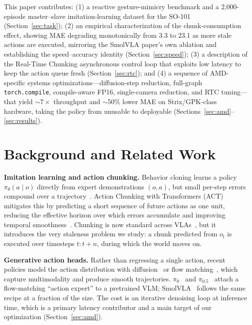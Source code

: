 \documentclass[blind]{gtac}
\begin{document}
This paper contributes: (1) a reactive gesture-mimicry benchmark and a
2{,}000-episode master--slave imitation-learning dataset for the SO-101
(Section~\ref{sec:task}); (2) an empirical characterization of the
chunk-consumption effect, showing MAE degrading monotonically from 3.3 to 23.1
as more stale actions are executed, mirroring the SmolVLA
paper's own ablation and establishing the speed--accuracy identity
(Section~\ref{sec:speed}); (3) a description of the Real-Time Chunking
asynchronous control loop that exploits low latency to keep the action queue
fresh (Section~\ref{sec:rtc}); and (4) a sequence of AMD-specific systems
optimizations---diffusion-step reduction, full-graph \texttt{torch.compile},
compile-aware FP16, single-camera reduction, and RTC tuning---that yield $\sim
7\times$ throughput and $\sim$50\% lower MAE on Strix/GPK-class hardware, taking
the policy from unusable to deployable (Sections~\ref{sec:amd}--\ref{sec:results}).

\section{Background and Related Work}
\label{sec:background}

\textbf{Imitation learning and action chunking.}
Behavior cloning learns a policy $\pi_\theta(a\mid o)$ directly from
expert demonstrations $(o,a)$, but small per-step errors compound over a
trajectory~\cite{act}. Action Chunking with Transformers (ACT) mitigates this by
predicting a short sequence of future actions as one unit, reducing the effective
horizon over which errors accumulate and improving temporal
smoothness~\cite{act}. Chunking is now standard across VLAs~\cite{pi0,smolvla},
but it introduces the very staleness problem we study: a chunk predicted from
$o_t$ is executed over timesteps $t\!:\!t\!+\!n$, during which the world moves on.

\textbf{Generative action heads.}
Rather than regressing a single action, recent policies model the action
distribution with diffusion~\cite{diffusionpolicy} or flow
matching~\cite{flowmatching}, which capture multimodality and produce smooth
trajectories. $\pi_0$~\cite{pi0} and $\pi_{0.5}$~\cite{pi05} attach a
flow-matching ``action expert'' to a pretrained VLM; SmolVLA~\cite{smolvla}
follows the same recipe at a fraction of the size. The cost is an iterative
denoising loop at inference time, which is a primary latency contributor and a
main target of our optimization (Section~\ref{sec:amd}).
\end{document}
